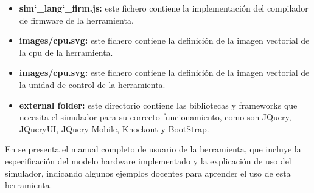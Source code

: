 \begin{itemize}
\item \textbf{sim\char`_lang\char`_firm.js: } este fichero contiene la implementación del compilador de firmware de la herramienta.

\item \textbf{images/cpu.svg: } este fichero contiene la definición de la imagen vectorial de la cpu de la herramienta.

\item \textbf{images/cpu.svg: } este fichero contiene la definición de la imagen vectorial de la unidad de control de la herramienta.

\item \textbf{external folder: } este directorio contiene las bibliotecas y frameworks que necesita el simulador para su correcto funcionamiento, como son JQuery, JQueryUI, JQuery Mobile, Knockout y BootStrap.

\end{itemize}

En \cite{wepsimManualUser} se presenta el manual completo de usuario de la herramienta, que incluye la especificación del modelo hardware implementado y la explicación de uso del simulador, indicando algunos ejemplos docentes para aprender el uso de esta herramienta.

\afterpage{\blankpage} %